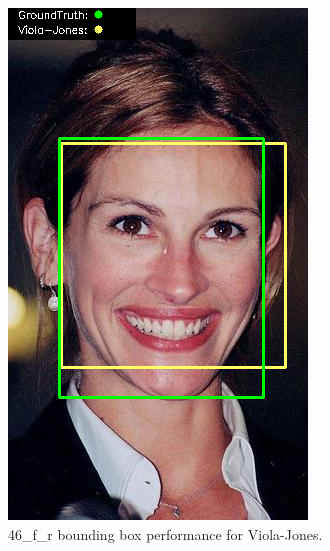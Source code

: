 \documentclass{l4proj}
\begin{document}
\begin{appendices}
\begin{figure}[h!]
  \centering
  \begin{minipage}{0.49\textwidth}
    \centering
     \includegraphics[width=\textwidth]{images/appendix/viola/46.png}
    \caption{46\_f\_r bounding box performance for Viola-Jones.}
    \label{whoopi_result}
  \end{minipage}
    \hfill
    \begin{minipage}{0.49\textwidth}
    \centering

\end{minipage}
\end{figure}
\end{appendices}
\end{document}
